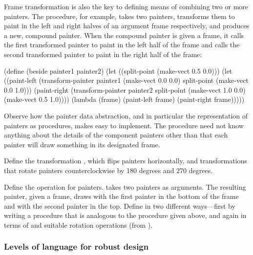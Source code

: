 \noindent
Frame transformation is also the key to defining means of combining two or more
painters.  The  procedure, for example, takes two painters,
transforms them to paint in the left and right halves of an argument frame
respectively, and produces a new, compound painter.  When the compound painter
is given a frame, it calls the first transformed painter to paint in the left
half of the frame and calls the second transformed painter to paint in the
right half of the frame:

\begin{codeBlock}
(define (beside painter1 painter2)
  (let ((split-point (make-vect 0.5 0.0)))
    (let ((paint-left
           (transform-painter
            painter1
            (make-vect 0.0 0.0)
            split-point
            (make-vect 0.0 1.0)))
          (paint-right
           (transform-painter
            painter2
            split-point
            (make-vect 1.0 0.0)
            (make-vect 0.5 1.0))))
      (lambda (frame)
        (paint-left frame)
        (paint-right frame)))))
\end{codeBlock}

\noindent
Observe how the painter data abstraction, and in particular the representation
of painters as procedures, makes  easy to implement.  The
 procedure need not know anything about the details of the
component painters other than that each painter will draw something in its
designated frame.

\begin{exerciseGroup}
\label{Exercise 2.50}
 Define the transformation
, which flips painters horizontally, and transformations that
rotate painters counterclockwise by 180 degrees and 270 degrees.

\label{Exercise 2.51}
 Define the  operation
for painters.   takes two painters as arguments.  The resulting
painter, given a frame, draws with the first painter in the bottom of the frame
and with the second painter in the top.  Define  in two different
ways---first by writing a procedure that is analogous to the 
procedure given above, and again in terms of  and suitable
rotation operations (from ).
\end{exerciseGroup}

\subsubsection*{Levels of language for robust design}

